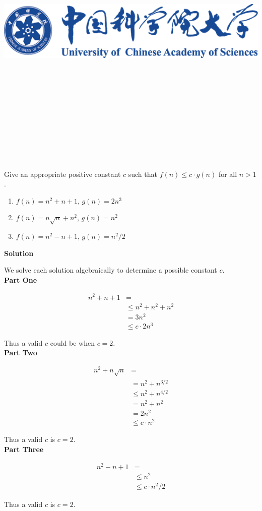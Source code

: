 \documentclass{article}
\title{
	\includegraphics[scale = 0.45]{images/title/ucas-logo.png}\\
    \vspace{1in}
    \textmd{\textbf{\hmwkClass\ \hmwkTitle}}\\
    \textmd{\textbf{\hmwkSubTitle}}\\
    \normalsize\vspace{0.1in}\small{\hmwkCompleteTime }\\
    \vspace{0.1in}\large{\textit{\hmwkClassInstructor\ }}\\
    \vspace{3in}
}
\author{\hmwkAuthorName}
\date{}
\begin{document}
\maketitle



%
%
%
%


\pagebreak

\begin{homeworkProblem}
	Give an appropriate positive constant \(c\) such that \(f(n) \leq c \cdot
	g(n)\) for all \(n > 1\).
	
	\begin{enumerate}
		\item \(f(n) = n^2 + n + 1\), \(g(n) = 2n^3\)
		\item \(f(n) = n\sqrt{n} + n^2\), \(g(n) = n^2\)
		\item \(f(n) = n^2 - n + 1\), \(g(n) = n^2 / 2\)
	\end{enumerate}
	
	\textbf{Solution}
	
	We solve each solution algebraically to determine a possible constant
	\(c\).
	\\
	
	\textbf{Part One}
	
	\[
	\begin{split}
	n^2 + n + 1 &=
	\\
	&\leq n^2 + n^2 + n^2
	\\
	&= 3n^2
	\\
	&\leq c \cdot 2n^3
	\end{split}
	\]
	
	Thus a valid \(c\) could be when \(c = 2\).
	\\
	
	\textbf{Part Two}
	
	\[
	\begin{split}
	n^2 + n\sqrt{n} &=
	\\
	&= n^2 + n^{3/2}
	\\
	&\leq n^2 + n^{4/2}
	\\
	&= n^2 + n^2
	\\
	&= 2n^2
	\\
	&\leq c \cdot n^2
	\end{split}
	\]
	
	Thus a valid \(c\) is \(c = 2\).
	\\
	
	\textbf{Part Three}
	
	\[
	\begin{split}
	n^2 - n + 1 &=
	\\
	&\leq n^2
	\\
	&\leq c \cdot n^2/2
	\end{split}
	\]
	
	Thus a valid \(c\) is \(c = 2\).
	
\end{homeworkProblem}
\end{document}
